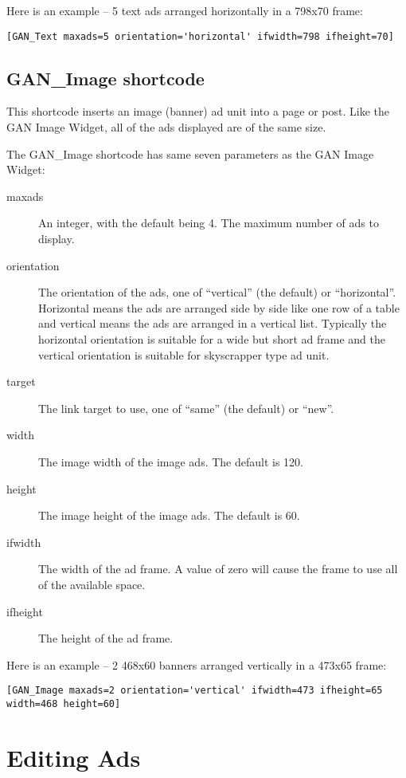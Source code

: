 \documentclass[letterpaper]{article}
\begin{document}
Here is an example -- 5 text ads arranged horizontally in a 798x70 frame:
\begin{verbatim}
[GAN_Text maxads=5 orientation='horizontal' ifwidth=798 ifheight=70]
\end{verbatim}

\subsection{GAN\_Image shortcode}

This shortcode inserts an image (banner) ad unit into a page or post.
Like the GAN Image Widget, all of the ads displayed are of the same
size. 

The GAN\_Image shortcode has same seven parameters as the GAN Image
Widget:
\begin{description}
  \item[maxads] An integer, with the default being 4.
The maximum number of ads to display.
  \item[orientation] The orientation of the ads, one of
``vertical'' (the default) or ``horizontal''. Horizontal means the ads are
arranged side by side like one row of a table and      vertical means
the ads are arranged in a vertical list. Typically the horizontal
orientation is suitable for a wide but short ad frame and the vertical
orientation is suitable for skyscrapper type ad unit.
  \item[target] The link target to use, one of ``same'' (the
default) or ``new''.
  \item[width] The image width of the image ads. The
default is 120.
  \item[height] The image height of the image ads. The
default is 60.
  \item[ifwidth] The width of the ad frame. A value
of zero will cause the frame to use all of the available space.
  \item[ifheight] The height of the ad frame.
\end{description}

Here is an example -- 2 468x60 banners arranged vertically in a 473x65 frame:
\begin{verbatim}
[GAN_Image maxads=2 orientation='vertical' ifwidth=473 ifheight=65 width=468 height=60]
\end{verbatim}

\section{Editing Ads}
\end{document}
